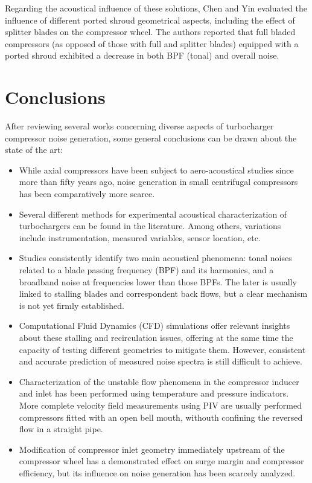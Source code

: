 Regarding the acoustical influence of these solutions, Chen and Yin \cite{chen2006turbocharger} evaluated the influence of different ported shroud geometrical aspects, including the effect of splitter blades on the compressor wheel. The authors reported that full bladed compressors (as opposed of those with full and splitter blades) equipped with a ported shroud exhibited a decrease in both BPF (tonal) and overall noise.

\section{Conclusions}

After reviewing several works concerning diverse aspects of turbocharger compressor noise generation, some general conclusions can be drawn about the state of the art:

\begin{itemize}
	\item While axial compressors have been subject to aero-acoustical studies since more than fifty years ago, noise generation in small centrifugal compressors has been comparatively more scarce.

	\item Several different methods for experimental acoustical characterization of turbochargers can be found in the literature. Among others, variations include instrumentation, measured variables, sensor location, etc.

	\item Studies consistently identify two main acoustical phenomena: tonal noises related to a blade passing frequency (BPF) and its harmonics, and a broadband noise at frequencies lower than those BPFs. The later is usually linked to stalling blades and correspondent back flows, but a clear mechanism is not yet firmly established.

	\item Computational Fluid Dynamics (CFD) simulations offer relevant insights about these stalling and recirculation issues, offering at the same time the capacity of testing different geometries to mitigate them. However, consistent and accurate prediction of measured noise spectra is still difficult to achieve.

  \item Characterization of the unstable flow phenomena in the compressor inducer and inlet has been performed using temperature and pressure indicators. More complete velocity field measurements using PIV are usually performed compressors fitted with an open bell mouth, withouth confining the reversed flow in a straight pipe. 

	\item Modification of compressor inlet geometry immediately upstream of the compressor wheel has a demonstrated effect on surge margin and compressor efficiency, but its influence on noise generation has been scarcely analyzed.

	\end{itemize}